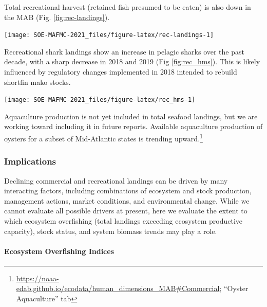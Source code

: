 \documentclass[
  10pt,
]{article}
\let\origfigure\figure
\let\endorigfigure\endfigure
\renewenvironment{figure}[1][2] {
    \expandafter\origfigure\expandafter[H]
} {
    \endorigfigure
}
\begin{document}
Total recreational harvest (retained fish presumed to be eaten) is also
down in the MAB (Fig. \ref{fig:rec-landings}).

\begin{figure}

{\centering \texttt{[image: SOE-MAFMC-2021\_files/figure-latex/rec-landings-1]} 

}

\caption{Total recreational seafood harvest (millions of fish) in the Mid-Atlantic region.}\label{fig:rec-landings}
\end{figure}

Recreational shark landings show an increase in pelagic sharks over the
past decade, with a sharp decrease in 2018 and 2019 (Fig
\ref{fig:rec_hms}). This is likely influenced by regulatory changes
implemented in 2018 intended to rebuild shortfin mako stocks.

\begin{figure}

{\centering \texttt{[image: SOE-MAFMC-2021\_files/figure-latex/rec\_hms-1]} 

}

\caption{Recreational shark landings from Large Pelagics Survey.}\label{fig:rec_hms}
\end{figure}

Aquaculture production is not yet included in total seafood landings,
but we are working toward including it in future reports. Available
aquaculture production of oysters for a subset of Mid-Atlantic states is
trending upward.\footnote{\url{https://noaa-edab.github.io/ecodata/human_dimensions_MAB\#Commercial};
  ``Oyster Aquaculture'' tab}

\hypertarget{implications}{%
\subsubsection{Implications}\label{implications}}

Declining commercial and recreational landings can be driven by many
interacting factors, including combinations of ecosystem and stock
production, management actions, market conditions, and environmental
change. While we cannot evaluate all possible drivers at present, here
we evaluate the extent to which ecosystem overfishing (total landings
exceeding ecosystem productive capacity), stock status, and system
biomass trends may play a role.

\hypertarget{ecosystem-overfishing-indices}{%
\paragraph{Ecosystem Overfishing
Indices}\label{ecosystem-overfishing-indices}}
\end{document}
